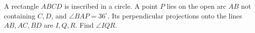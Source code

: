 A rectangle $ABCD$ is inscribed in a circle. A point $P$ lies on the open arc $AB$ not containing $C,D$, and $\angle BAP=36^\circ$. Its perpendicular projections onto the lines $AB,AC,BD$ are $I,Q,R$. Find $\angle IQR$.
